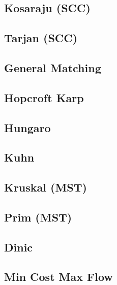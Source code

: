\subsection{Kosaraju (SCC)}
\raggedbottom
\hrulefill
\subsection{Tarjan (SCC)}
\raggedbottom
\hrulefill
\subsection{General Matching}
\raggedbottom
\hrulefill
\subsection{Hopcroft Karp}
\raggedbottom
\hrulefill
\subsection{Hungaro}
\raggedbottom
\hrulefill
\subsection{Kuhn}
\raggedbottom
\hrulefill
\subsection{Kruskal (MST)}
\raggedbottom
\hrulefill
\subsection{Prim (MST)}
\raggedbottom
\hrulefill
\subsection{Dinic}
\raggedbottom
\hrulefill
\subsection{Min Cost Max Flow}
\raggedbottom
\hrulefill
